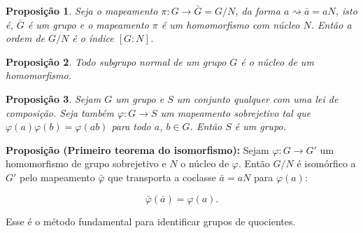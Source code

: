 \documentclass[a4paper,12pt]{report}
\theoremstyle{plain}
\newtheorem{proposicao}{Proposição}[section]
\theoremstyle{definition}
\begin{document}
\begin{proposicao}
	Seja o mapeamento \(\pi: G \longrightarrow \bar G = G/N\), da forma
	\(a \rightsquigarrow \bar a = aN\), isto é, \(\bar G\) é um grupo e o
	mapeamento \(\pi\) é um homomorfismo com núcleo \(N\). Então a ordem de
	\(G/N\) é o índice \([G:N]\).	
\end{proposicao}

\begin{proposicao}
	Todo subgrupo normal de um grupo \(G\) é o núcleo
	de um homomorfismo.	
\end{proposicao}

\begin{proposicao}
	Sejam \(G\) um grupo e \(S\) um conjunto qualquer
	com uma lei de composição. Seja também \(\varphi:G\longrightarrow S\) um
	mapeamento sobrejetivo tal que \(\varphi(a)\varphi(b) = \varphi(ab)\)
	para todo \(a\), \(b\in G\). Então \(S\) é um grupo.	
\end{proposicao}

\textbf{Proposição (Primeiro teorema do isomorfismo):} Sejam
\(\varphi:G \longrightarrow G'\) um homomorfismo de grupo sobrejetivo e
\(N\) o núcleo de \(\varphi\). Então \(G/N\) é isomórfico a \(G'\) pelo
mapeamento \(\bar\varphi\) que transporta a coclasse \(\bar a = aN\)
para \(\varphi(a)\):

\[\bar\varphi(\bar a) = \varphi(a).\]

Esse é o método fundamental para identificar grupos de quocientes.


{}



\end{document}
